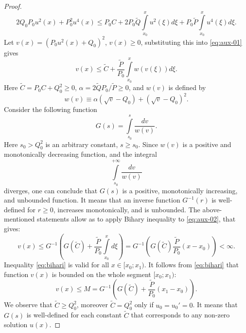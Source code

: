 \begin{proof}
	\begin{equation}
		2 Q_0 P_0 u^2(x) + P_0^2 u^4(x) \le P_0 C + 2 P_0 \widetilde{Q} \int \limits_{x_0}^{x} u^2(\xi) d\xi + P_0 \widetilde{P} \int \limits_{x_0}^{x} u^4(\xi) d\xi.
		\label{eq:aux-01}
	\end{equation}
	Let $v(x) = (P_0 u^2(x) + Q_0)^2$, $v(x) \ge 0$, substituting this into \eqref{eq:aux-01} gives
	\begin{equation}
		v(x) \le \widetilde{C} + \dfrac{\widetilde{P}}{P_0} \int \limits_{x_0}^{x} w(v(\xi)) d\xi.
		\label{eq:aux-02}
	\end{equation}
	Here $\widetilde{C} = P_0 C + Q_0^2 \ge 0$, $\alpha = 2 \widetilde{Q} P_0 / \widetilde{P} \ge 0$, and $w(v)$ is defined by
	\begin{equation}
		w(v) \equiv \alpha (\sqrt{v} - Q_0) + (\sqrt{v} - Q_0)^2.
	\end{equation}
	Consider the following function
	\begin{equation}
		G(s) = \int \limits_{s_0}^{s} \dfrac{dv}{w(v)}.
	\end{equation}
	Here $s_0 > Q_0^2$ is an arbitrary constant, $s \ge s_0$.
	Since $w(v)$ is a positive and monotonically decreasing function, and the integral
	\begin{equation}
		\int \limits_{s_0}^{+\infty} \dfrac{dv}{w(v)}
	\end{equation}
	diverges, one can conclude that $G(s)$ is a positive, monotonically increasing, and unbounded function.
	It means that an inverse function $G^{-1}(r)$ is well-defined for $r \ge 0$, increases monotonically, and is unbounded.
	The above-mentioned statements allow as to apply Bihary inequality \cite[theorem 2.3.1]{Pachpatte} to \eqref{eq:aux-02}, that gives:
	\begin{equation}
		v(x) \le G^{-1} \left( G(\widetilde{C}) + \dfrac{\widetilde{P}}{P_0} \int \limits_{x_0}^{x} d\xi \right) = G^{-1} \left( G(\widetilde{C}) \dfrac{\widetilde{P}}{P_0} (x - x_0) \right) < \infty.
		\label{eq:bihari}
	\end{equation}
	Inequality \eqref{eq:bihari} is valid for all $x \in [x_0; x_1)$.
	It follows from \eqref{eq:bihari} that function $v(x)$ is bounded on the whole segment $[x_0; x_1)$:
	\begin{equation}
		v(x) \le M = G^{-1} \left( G(\widetilde{C}) + \dfrac{\widetilde{P}}{P_0} (x_1 - x_0) \right).
	\end{equation}
	We observe that $\widetilde{C} \ge Q_0^2$, moreover $\widetilde{C} = Q_0^2$ only if $u_0 = u_0' = 0$.
	It means that $G(s)$ is well-defined for each constant $\widetilde{C}$ that corresponds to any non-zero solution $u(x)$.

\end{proof}
